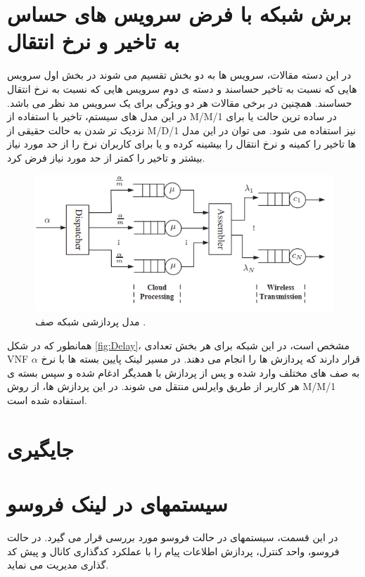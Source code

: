 \section{برش شبکه با فرض سرویس های حساس به تاخیر و نرخ انتقال}
در این دسته مقالات، سرویس ها به دو بخش تقسیم می شوند در بخش اول سرویس هایی که  نسبت به تاخیر حساسند و دسته ی دوم سرویس هایی که نسبت به نرخ انتقال حساسند. همچنین در برخی مقالات هر دو ویژگی برای یک سرویس مد نظر می باشد.
در این مدل های سیستم، تاخیر با استفاده از M/M/1 در ساده ترین حالت یا برای نزدیک تر شدن به حالت حقیقی از M/D/1 نیز استفاده می شود. می توان در این مدل ها تاخیر را کمینه و نرخ انتقال را بیشینه کرده و یا 
برای کاربران نرخ را از حد مورد نیاز بیشتر و تاخیر را کمتر از حد مورد نیاز فرض کرد\cite{frdl,luong2018novel,luong2018novel1,guo2016exploiting}.
 \begin{figure}[H]
  \centering
    \includegraphics[scale = 0.7]{./fig/Delay}
  \caption{مدل پردازشی شبکه صف \cite{frdl}.}
  \label{fig:Delay}
\end{figure}
همانطور که در شکل \eqref{fig:Delay}، مشخص است، در این شبکه برای هر بخش تعدادی VNF قرار دارند که پردازش ها را انجام می دهند. در مسیر لینک پایین
بسته ها با نرخ $\alpha$ به صف های مختلف وارد شده و پس از پردازش با همدیگر ادغام شده و سپس بسته ی هر کاربر از طریق وایرلس منتقل می شوند.
در این پردازش ها، از روش M/M/1 استفاده شده است.

\section{جایگیری } 
 \section{ سیستمهای   در لینک فروسو }
در این قسمت، سیستمهای   در حالت فروسو مورد بررسی قرار می گیرد. در حالت فروسو،  واحد کنترل، پردازش اطلاعات پیام را با عملکرد کدگذاری کانال و پیش کد گذاری  مدیریت می نماید.
